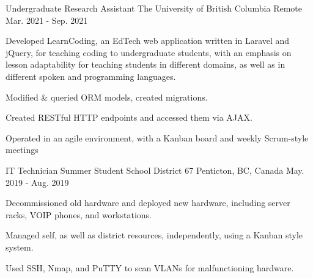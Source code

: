 

\begin{cventries}

  \cventry
    {Undergraduate Research Assistant} %
    {The University of British Columbia} %
    {Remote} %
    {Mar. 2021 - Sep. 2021} %
    {
      \begin{cvitems} %
        \item 
        {
            Developed LearnCoding, an EdTech web application written in Laravel 
            and jQuery, for teaching coding to undergraduate students, with an 
            emphasis on lesson adaptability for teaching students in 
            different domains, as well as in different spoken and programming 
            languages.
        }
        \item
        {
            Modified \& queried ORM models, created migrations.
        }
        \item
        {
            Created RESTful HTTP endpoints and accessed them via AJAX.
        }
        \item
        {
            Operated in an agile environment, with a Kanban board and weekly Scrum-style meetings
        }
      \end{cvitems}
    }

  \cventry
    {IT Technician Summer Student} %
    {School District 67} %
    {Penticton, BC, Canada} %
    {May. 2019 - Aug. 2019} %
    {
      \begin{cvitems} %
        \item 
        {
            Decommissioned old hardware and deployed new hardware, 
            including server racks, VOIP phones, and workstations. 
        }
        \item
        {
            Managed self, as well as district resources, independently, 
            using a Kanban style system.
        }
        \item
        {
            Used SSH, Nmap, and PuTTY to scan VLANs for malfunctioning hardware. 
        }
      \end{cvitems}
    }

\end{cventries}
